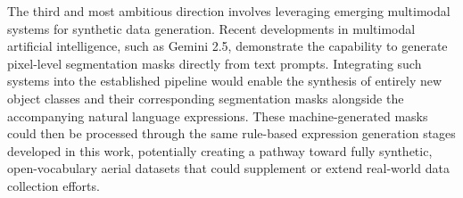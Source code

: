 The third and most ambitious direction involves leveraging emerging multimodal systems for synthetic data generation. Recent developments in multimodal artificial intelligence, such as Gemini 2.5, demonstrate the capability to generate pixel-level segmentation masks directly from text prompts. Integrating such systems into the established pipeline would enable the synthesis of entirely new object classes and their corresponding segmentation masks alongside the accompanying natural language expressions. These machine-generated masks could then be processed through the same rule-based expression generation stages developed in this work, potentially creating a pathway toward fully synthetic, open-vocabulary aerial datasets that could supplement or extend real-world data collection efforts.